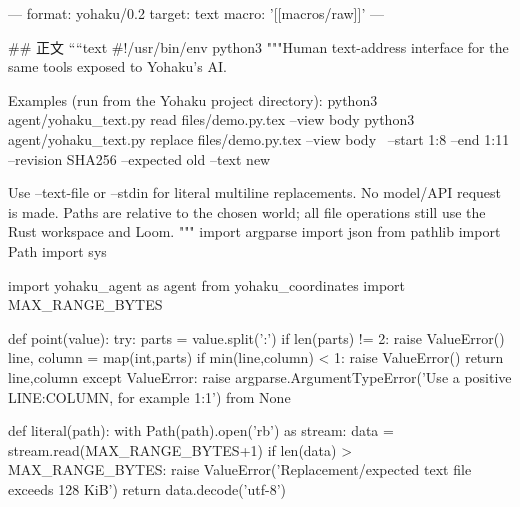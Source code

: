 ---
format: yohaku/0.2
target: text
macro: '[[macros/raw]]'
---

## 正文
````text
#!/usr/bin/env python3
"""Human text-address interface for the same tools exposed to Yohaku's AI.

Examples (run from the Yohaku project directory):
  python3 agent/yohaku_text.py read files/demo.py.tex --view body
  python3 agent/yohaku_text.py replace files/demo.py.tex --view body \
    --start 1:8 --end 1:11 --revision SHA256 --expected old --text new

Use --text-file or --stdin for literal multiline replacements. No model/API
request is made. Paths are relative to the chosen world; all file operations
still use the Rust workspace and Loom.
"""
import argparse
import json
from pathlib import Path
import sys

import yohaku_agent as agent
from yohaku_coordinates import MAX_RANGE_BYTES


def point(value):
    try:
        parts = value.split(':')
        if len(parts) != 2:
            raise ValueError()
        line, column = map(int,parts)
        if min(line,column) < 1:
            raise ValueError()
        return line,column
    except ValueError:
        raise argparse.ArgumentTypeError('Use a positive LINE:COLUMN, for example 1:1') from None


def literal(path):
    with Path(path).open('rb') as stream:
        data = stream.read(MAX_RANGE_BYTES+1)
    if len(data) > MAX_RANGE_BYTES:
        raise ValueError('Replacement/expected text file exceeds 128 KiB')
    return data.decode('utf-8')


